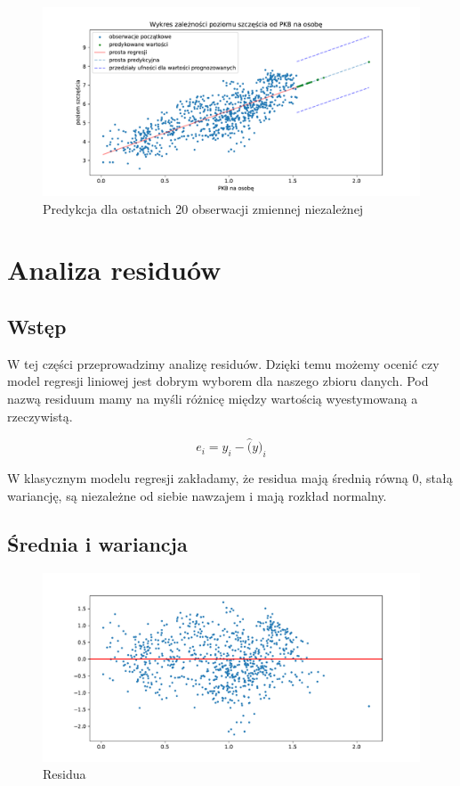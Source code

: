 \documentclass{article}
\theoremstyle{break}
\begin{document}
\begin{figure}[H]
	\begin{center}
		\includegraphics[scale=0.6]{pred.pdf}
		\caption{Predykcja dla ostatnich 20 obserwacji zmiennej niezależnej}
		\label{fig:predykcja}
	\end{center}
\end{figure}

\section{Analiza residuów}
\subsection{Wstęp}

W tej części przeprowadzimy analizę residuów. Dzięki temu możemy ocenić czy model regresji liniowej jest dobrym wyborem dla naszego zbioru danych. Pod nazwą residuum mamy na myśli różnicę między wartością wyestymowaną a rzeczywistą.

\begin{equation}
	e_i = y_i - \hat(y)_i
\end{equation}

W klasycznym modelu regresji zakładamy, że residua mają średnią równą 0, stałą wariancję, są niezależne od siebie nawzajem i mają rozkład normalny.

\subsection{Średnia i wariancja}
\begin{figure}[H]
	\begin{center}
		\includegraphics[scale=0.5]{res.pdf}
		\caption{Residua}
		\label{fig:res}
	\end{center}
\end{figure}
\end{document}
